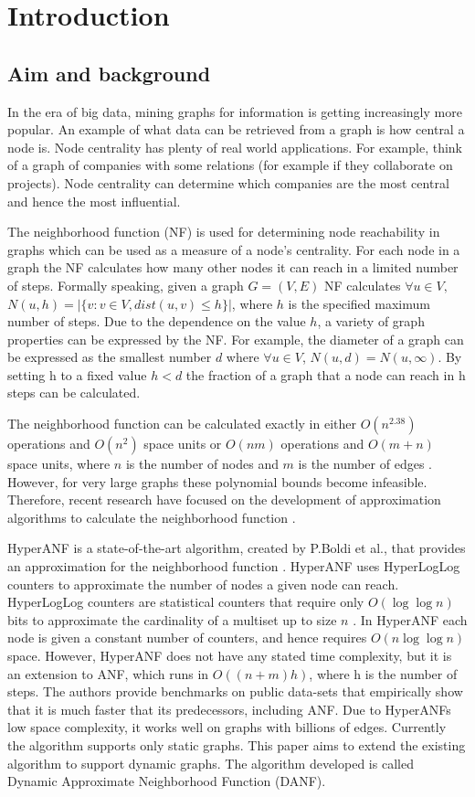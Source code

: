 \chapter{Introduction}

\section{Aim and background}
In the era of big data, mining graphs for information is getting increasingly more popular. An example of what data can be retrieved from a graph is how central a node is. Node centrality has plenty of real world applications. For example, think of a graph of companies with some relations (for example if they collaborate on projects). Node centrality can determine which companies are the most central and hence the most influential. 

The neighborhood function (NF) is used for determining node reachability in graphs which can be used as a measure of a node's centrality. For each node in a graph the NF calculates how many other nodes it can reach in a limited number of steps. Formally speaking, given a graph $G = (V,E)$ NF calculates $\forall u \in V,$ $N(u,h) = |\{v : v \in V, dist(u,v) \leq h \}|$, where $h$ is the specified maximum number of steps. Due to the dependence on the value $h$, a variety of graph properties can be expressed by the NF. For example, the diameter of a graph can be expressed as the smallest number $d$ where $ \forall u \in V$, $N(u,d) = N(u,\infty)$. By setting h to a fixed value $h < d$ the fraction of a graph that a node can reach in h steps can be calculated.

The neighborhood function can be calculated exactly in either $O(n^{2.38})$ operations and $O(n^2)$ space units or $O(nm)$ operations and $O(m + n)$ space units, where $n$ is the number of nodes and $m$ is the number of edges \cite{Palmer01}. However, for very large graphs these polynomial bounds become infeasible. Therefore, recent research have focused on the development of approximation algorithms to calculate the neighborhood function \cite{hyperanf,Palmer01,anf}. 

HyperANF is a state-of-the-art algorithm, created by P.Boldi et al., that provides an approximation for the neighborhood function \cite{hyperanf}. HyperANF uses HyperLogLog counters to approximate the number of nodes a given node can reach. HyperLogLog counters are statistical counters that require only $O( \log\log n)$ bits to approximate the cardinality of a multiset up to size $n$ \cite{hyperloglog}. In HyperANF each node is given a constant number of counters, and hence requires $O(n \log\log n)$ space. However, HyperANF does not have any stated time complexity, but it is an extension to ANF, which runs in $O((n+m)h)$, where h is the number of steps. The authors provide benchmarks on public data-sets that empirically show that it is much faster that its predecessors, including ANF. Due to HyperANFs low space complexity, it works well on graphs with billions of edges. Currently the algorithm supports only static graphs. This paper aims to extend the existing algorithm to support dynamic graphs. The algorithm developed is called Dynamic Approximate Neighborhood Function (DANF).

